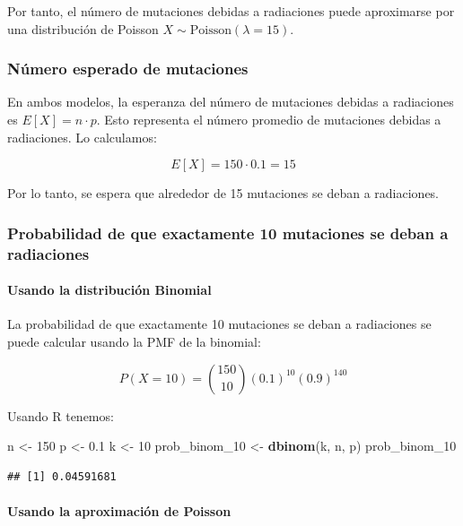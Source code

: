 \documentclass[
]{article}
\newenvironment{Shaded}{\begin{snugshade}}{\end{snugshade}}
\newcommand{\DecValTok}[1]{\textcolor[rgb]{0.00,0.00,0.81}{#1}}
\newcommand{\FloatTok}[1]{\textcolor[rgb]{0.00,0.00,0.81}{#1}}
\newcommand{\FunctionTok}[1]{\textcolor[rgb]{0.13,0.29,0.53}{\textbf{#1}}}
\newcommand{\NormalTok}[1]{#1}
\newcommand{\OtherTok}[1]{\textcolor[rgb]{0.56,0.35,0.01}{#1}}
\begin{document}
Por tanto, el número de mutaciones debidas a radiaciones puede aproximarse por una distribución de Poisson \(X \sim \text{Poisson}(\lambda = 15)\).

\subsubsection{Número esperado de mutaciones}\label{nuxfamero-esperado-de-mutaciones}

En ambos modelos, la esperanza del número de mutaciones debidas a radiaciones es \(E[X] = n \cdot p\). Esto representa el número promedio de mutaciones debidas a radiaciones. Lo calculamos:

\[ E[X] = 150 \cdot 0.1 = 15 \]

Por lo tanto, se espera que alrededor de 15 mutaciones se deban a radiaciones.

\subsubsection{Probabilidad de que exactamente 10 mutaciones se deban a radiaciones}\label{probabilidad-de-que-exactamente-10-mutaciones-se-deban-a-radiaciones}

\paragraph{Usando la distribución Binomial}\label{usando-la-distribuciuxf3n-binomial}

La probabilidad de que exactamente 10 mutaciones se deban a radiaciones se puede calcular usando la PMF de la binomial:

\[ P(X = 10) = \binom{150}{10} (0.1)^{10} (0.9)^{140} \]

Usando R tenemos:

\begin{Shaded}
\begin{Highlighting}[]
\NormalTok{n }\OtherTok{\textless{}{-}} \DecValTok{150}
\NormalTok{p }\OtherTok{\textless{}{-}} \FloatTok{0.1}
\NormalTok{k }\OtherTok{\textless{}{-}} \DecValTok{10}
\NormalTok{prob\_binom\_10 }\OtherTok{\textless{}{-}} \FunctionTok{dbinom}\NormalTok{(k, n, p)}
\NormalTok{prob\_binom\_10}
\end{Highlighting}
\end{Shaded}

\begin{verbatim}
## [1] 0.04591681
\end{verbatim}

\paragraph{Usando la aproximación de Poisson}\label{usando-la-aproximaciuxf3n-de-poisson}
\end{document}
